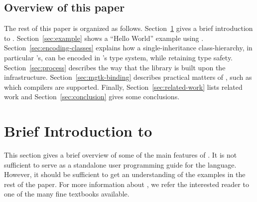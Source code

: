 \documentclass[finalversion]{usetex-v1}
\begin{document}



\subsection{Overview of this paper}
\label{sec:overview-this-paper}

The rest of this paper is organized as follows.
Section~\ref{sec:brief-intr-sml} gives a brief introduction to \sml.
Section~\ref{sec:example} shows a ``Hello World'' example using \mgtk.
Section~\ref{sec:encoding-classes} explains how a single-inheritance
class-hierarchy, in particular \gtk's, can be encoded in \sml's type
system, while retaining type safety.  Section~\ref{sec:process}
describes the way that the \mgtk library is built upon the
\mgtk infrastructure.
Section~\ref{sec:mgtk-binding} describes practical matters of \mgtk,
such as which \sml compilers are supported.  Finally,
Section~\ref{sec:related-work} lists related work and
Section~\ref{sec:conclusion} gives some conclusions.



\section{Brief Introduction to \sml{}}
\label{sec:brief-intr-sml}

This section gives a brief overview of some of the main features of
\sml{}.  It is not sufficient to serve as a standalone user
programming guide for the language.
However, it should be sufficient to get an understanding of the examples in
the rest of the paper.  For more
information about \sml{}, we refer the interested reader to one of the
many fine textbooks \cite{Hansen-Rischel:1999,Paulson:1996}
available.


\end{document}
